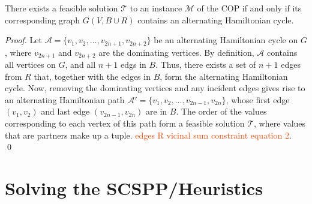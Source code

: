 \documentclass[oribibl]{llncs}
\begin{document}
\begin{theorem}
	\label{thm:copsoln}
	There exists a feasible solution $\mathcal{T}$ to an instance $\mathcal{M}$ of the COP if and only if its corresponding graph $G(V, B\cup R)$ contains an alternating Hamiltonian cycle.
\end{theorem}
\begin{proof}
	Let $\mathcal{A} = \{v_1, v_2, ..., v_{2n+1}, v_{2n+2}\}$ be an alternating Hamiltonian cycle on $G$, where $v_{2n+1}$ and $v_{2n+2}$ are the dominating vertices. By definition, $\mathcal{A}$ contains all vertices on $G$, and all $n+1$ edgs in $B$. Thus, there exists a set of $n+1$ edges from $R$ that, together with the edges in $B$, form the alternating Hamiltonian cycle. Now, removing the dominating vertices and any incident edges gives rise to an alternating Hamiltonian path $\mathcal{A}' = \{v_1, v_2, ..., v_{2n-1}, v_{2n}\}$, whose first edge $(v_1, v_2)$ and last edge $(v_{2n-1}, v_{2n})$ are in $B$. The order of the values corresponding to each vertex of this path form a feasible solution $\mathcal{T}$, where values that are partners make up a tuple. \textcolor{OrangeRed}{edges R vicinal sum constraint equation 2}. \qed
\end{proof}


\section{Solving the SCSPP/Heuristics}
\label{sec:scsppsoln}
\end{document}
